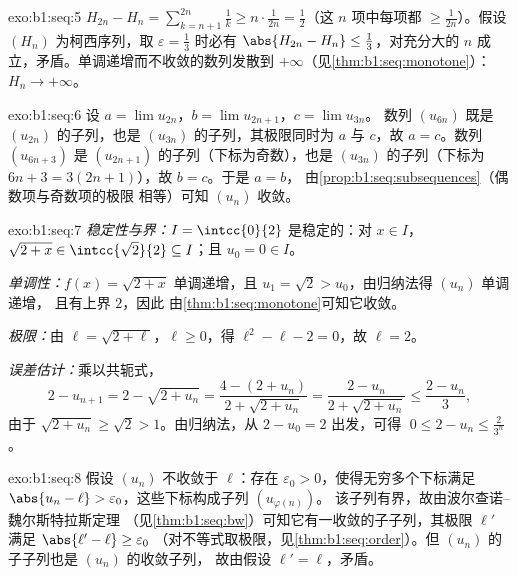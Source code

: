 \begin{solution}{exo:b1:seq:5}
$H_{2n} - H_n = \sum_{k=n+1}^{2n} \frac 1k \geq n \cdot
\frac{1}{2n} = \frac12$（这 $n$ 项中每项都 $\geq
\frac{1}{2n}$）。假设 $(H_n)$ 为柯西序列，取 $\varepsilon =
\frac13$ 时必有 $\abs{H_{2n} - H_n} \leq \frac13$，对充分大的
$n$ 成立，矛盾。单调递增而不收敛的数列发散到
$+\infty$（见\cref{thm:b1:seq:monotone}）：$H_n \to +\infty$。
\end{solution}

\begin{solution}{exo:b1:seq:6}
设 $a = \lim u_{2n}$，$b = \lim u_{2n+1}$，$c = \lim u_{3n}$。
数列 $(u_{6n})$ 既是 $(u_{2n})$ 的子列，也是
$(u_{3n})$ 的子列，其极限同时为 $a$ 与 $c$，故 $a = c$。数列
$(u_{6n+3})$ 是 $(u_{2n+1})$ 的子列（下标为奇数），也是
$(u_{3n})$ 的子列（下标为 $6n + 3 = 3(2n+1)$），故 $b = c$。于是 $a = b$，
由\cref{prop:b1:seq:subsequences}（偶数项与奇数项的极限
相等）可知 $(u_n)$ 收敛。
\end{solution}

\begin{solution}{exo:b1:seq:7}
\emph{稳定性与界：}$I = \intcc{0}{2}$ 是稳定的：对 $x \in
I$，$\sqrt{2 + x} \in \intcc{\sqrt 2}{2} \subseteq I$；且 $u_0 = 0
\in I$。

\emph{单调性：}$f(x) = \sqrt{2+x}$ 单调递增，且 $u_1 =
\sqrt 2 > u_0$，由归纳法得 $(u_n)$ 单调递增，
且有上界 $2$，因此
由\cref{thm:b1:seq:monotone}可知它收敛。

\emph{极限：}由 $\ell = \sqrt{2 + \ell}$，$\ell \geq 0$，得
$\ell^2 - \ell - 2 = 0$，故 $\ell = 2$。

\emph{误差估计：}乘以共轭式，
\[
2 - u_{n+1} = 2 - \sqrt{2 + u_n}
= \frac{4 - (2 + u_n)}{2 + \sqrt{2+u_n}}
= \frac{2 - u_n}{2 + \sqrt{2 + u_n}}
\leq \frac{2 - u_n}{3},
\]
由于 $\sqrt{2 + u_n} \geq \sqrt 2 > 1$。由归纳法，从 $2 - u_0
= 2$ 出发，可得 $\;0 \leq 2 - u_n \leq \frac{2}{3^n}$。
\end{solution}

\begin{solution}{exo:b1:seq:8}
假设 $(u_n)$ 不收敛于 $\ell$：存在 $\varepsilon_0
> 0$，使得无穷多个下标满足 $\abs{u_n - \ell} >
\varepsilon_0$，这些下标构成子列 $(u_{\varphi(n)})$。
该子列有界，故由波尔查诺–魏尔斯特拉斯定理
（见\cref{thm:b1:seq:bw}）可知它有一收敛的子子列，其极限
$\ell'$ 满足 $\abs{\ell' - \ell} \geq \varepsilon_0$
（对不等式取极限，见\cref{thm:b1:seq:order}）。但
$(u_n)$ 的子子列也是 $(u_n)$ 的收敛子列，
故由假设 $\ell' = \ell$，矛盾。
\end{solution}


